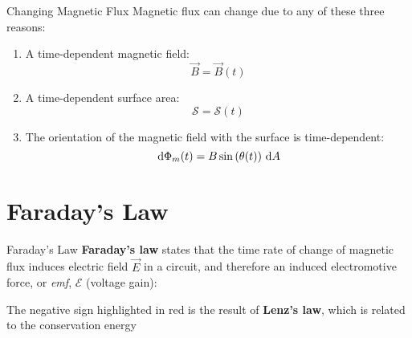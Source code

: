 \documentclass[12pt,aspectratio=169]{beamer}
\begin{document}
\begin{frame}{Changing Magnetic Flux}
  Magnetic flux can change due to any of these three reasons:
  \begin{enumerate}
  \item A time-dependent magnetic field:
    \begin{displaymath}
      \vec B=\vec B(t)
    \end{displaymath}
  \item A time-dependent surface area:
    \begin{displaymath}
      \mathcal S=\mathcal S(t)
    \end{displaymath}
  \item The orientation of the magnetic field with the surface is
    time-dependent:
    \begin{displaymath}
      \dl\Phi_m(t)=%
      B\sin\left(\theta(t)\right)\dl A
    \end{displaymath}
  \end{enumerate}
\end{frame}



\section{Faraday's Law}

\begin{frame}{Faraday's Law}
  \textbf{Faraday's law} states that the time rate of change of magnetic flux
  induces electric field $\vec E$ in a circuit, and therefore an
  induced electromotive force, or \emph{emf}, $\mathcal E$ (voltage gain):

  
  The negative sign {\color{red}highlighted in red} is the result of
  \textbf{Lenz's law}, which is related to the conservation energy
\end{frame}
\end{document}
